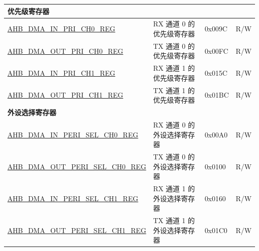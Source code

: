 \begin{longtable}{ | p{8cm} | p{8cm} | p{1.3cm} | p{1.5cm} | }
\multicolumn{4}{|l|}{\textbf{优先级寄存器}} \\ \hline
\hyperref[regdesc:AHBDMAINPRICHNREG]{AHB\_DMA\_IN\_PRI\_CH0\_REG} & RX 通道 0 的优先级寄存器 & 0x009C & R/W \\ \hline
\hyperref[regdesc:AHBDMAOUTPRICHNREG]{AHB\_DMA\_OUT\_PRI\_CH0\_REG} & TX 通道 0 的优先级寄存器 & 0x00FC & R/W \\ \hline
\hyperref[regdesc:AHBDMAINPRICHNREG]{AHB\_DMA\_IN\_PRI\_CH1\_REG} & RX 通道 1 的优先级寄存器 & 0x015C & R/W \\ \hline
\hyperref[regdesc:AHBDMAOUTPRICHNREG]{AHB\_DMA\_OUT\_PRI\_CH1\_REG} & TX 通道 1 的优先级寄存器 & 0x01BC & R/W \\ \hline
\multicolumn{4}{|l|}{\textbf{外设选择寄存器}} \\ \hline
\hyperref[regdesc:AHBDMAINPERISELCHNREG]{AHB\_DMA\_IN\_PERI\_SEL\_CH0\_REG} & RX 通道 0 的外设选择寄存器 & 0x00A0 & R/W \\ \hline
\hyperref[regdesc:AHBDMAOUTPERISELCHNREG]{AHB\_DMA\_OUT\_PERI\_SEL\_CH0\_REG} & TX 通道 0 的外设选择寄存器 & 0x0100 & R/W \\ \hline
\hyperref[regdesc:AHBDMAINPERISELCHNREG]{AHB\_DMA\_IN\_PERI\_SEL\_CH1\_REG} & RX 通道 1 的外设选择寄存器 & 0x0160 & R/W \\ \hline
\hyperref[regdesc:AHBDMAOUTPERISELCHNREG]{AHB\_DMA\_OUT\_PERI\_SEL\_CH1\_REG} & TX 通道 1 的外设选择寄存器 & 0x01C0 & R/W \\ \hline
\end{longtable}
